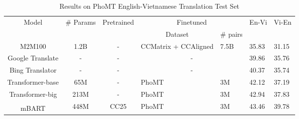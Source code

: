 \documentclass[11pt]{article}
\begin{document}
 \begin{table*}[ht]
\centering
\caption{Results on PhoMT English-Vietnamese Translation Test Set}

\begin{threeparttable}

\begin{tabular}{c|c|c|ll|l|l}
\hline
\multirow{2}{*}{Model}       & \multicolumn{1}{l|}{\multirow{2}{*}{\# Params}} & \multirow{2}{*}{Pretrained} & \multicolumn{2}{c|}{Finetuned}                       & \multicolumn{1}{c|}{\multirow{2}{*}{En-Vi}} & \multicolumn{1}{c}{\multirow{2}{*}{Vi-En}} \\ \cline{4-5}
                             & \multicolumn{1}{l|}{}                           &                              & \multicolumn{1}{c|}{Dataset}              & \# pairs & \multicolumn{1}{c|}{}                       & \multicolumn{1}{c}{}                       \\ \hline
M2M100                       & 1.2B                                            & -                            & \multicolumn{1}{l|}{CCMatrix + CCAligned} & 7.5B     & 35.83                                       & 31.15                                      \\ \hline
Google Translate             & -                                               & -                            & \multicolumn{2}{c|}{-}                               & 39.86                                       & 35.76                                      \\ \hline
Bing Translator              & -                                               & -                            & \multicolumn{2}{c|}{-}                               & 40.37                                       & 35.74                                      \\ \hline
Transformer-base             & 65M                                             & -                            & \multicolumn{1}{l|}{PhoMT}                & 3M       & 42.12                                       & 37.19                                      \\ \hline
Transformer-big            & 213M                                            & -                            & \multicolumn{1}{l|}{PhoMT}                & 3M       & 42.94                                       & 37.83                                      \\ \hline
mBART\textsuperscript{}                       & 448M                                            & CC25                         & \multicolumn{1}{l|}{PhoMT}                & 3M       & 43.46                                       & 39.78                                      \\ \hline

\end{tabular}
\end{threeparttable}
\end{table*}
\end{document}
